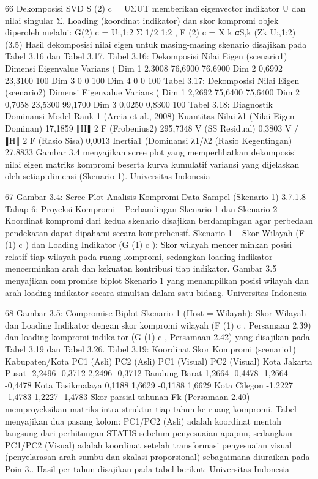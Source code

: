 66
Dekomposisi SVD S
(2)
c = UΣUT memberikan eigenvector indikator U dan nilai singular
Σ. Loading (koordinat indikator) dan skor kompromi objek diperoleh melalui:
G(2)
c = U:,1:2 Σ
1/2
1:2 , F
(2)
c =
X
k
αS,k (Zk U:,1:2) (3.5)
Hasil dekomposisi nilai eigen untuk masing-masing skenario disajikan pada Tabel 3.16
dan Tabel 3.17.
Tabel 3.16: Dekomposisi Nilai Eigen (scenario1)
Dimensi Eigenvalue Varians (%
Dim 1 2,3008 76,6900 76,6900
Dim 2 0,6992 23,3100 100
Dim 3 0 0 100
Dim 4 0 0 100
Tabel 3.17: Dekomposisi Nilai Eigen (scenario2)
Dimensi Eigenvalue Varians (%
Dim 1 2,2692 75,6400 75,6400
Dim 2 0,7058 23,5300 99,1700
Dim 3 0,0250 0,8300 100
Tabel 3.18: Diagnostik Dominansi Model Rank-1 (Areia et al., 2008)
Kuantitas Nilai
λ1 (Nilai Eigen Dominan) 17,1859
∥H∥
2
F
(Frobenius2) 295,7348
V (SS Residual) 0,3803
V /∥H∥
2
F
(Rasio Sisa) 0,0013
Inertia1 (Dominansi %
λ1/λ2 (Rasio Kegentingan) 27,8833
Gambar 3.4 menyajikan scree plot yang memperlihatkan dekomposisi nilai eigen
matriks kompromi beserta kurva kumulatif variansi yang dijelaskan oleh setiap dimensi
(Skenario 1).
Universitas Indonesia

67
Gambar 3.4: Scree Plot Analisis Kompromi Data Sampel (Skenario 1)
3.7.1.8 Tahap 6: Proyeksi Kompromi – Perbandingan Skenario 1 dan Skenario 2
Koordinat kompromi dari kedua skenario disajikan berdampingan agar perbedaan
pendekatan dapat dipahami secara komprehensif.
Skenario 1 – Skor Wilayah (F
(1)
c ) dan Loading Indikator (G
(1)
c ): Skor wilayah mencerminkan posisi relatif tiap wilayah pada ruang kompromi, sedangkan loading indikator
mencerminkan arah dan kekuatan kontribusi tiap indikator. Gambar 3.5 menyajikan compromise biplot Skenario 1 yang menampilkan posisi wilayah dan arah loading indikator
secara simultan dalam satu bidang.
Universitas Indonesia

68
Gambar 3.5: Compromise Biplot Skenario 1 (Host = Wilayah): Skor Wilayah dan Loading
Indikator
dengan skor kompromi wilayah (F
(1)
c , Persamaan 2.39) dan loading kompromi indikator (G
(1)
c , Persamaan 2.42) yang disajikan pada Tabel 3.19 dan Tabel 3.26.
Tabel 3.19: Koordinat Skor Kompromi (scenario1)
Kabupaten/Kota PC1 (Asli) PC2 (Asli) PC1 (Visual) PC2 (Visual)
Kota Jakarta Pusat -2,2496 -0,3712 2,2496 -0,3712
Bandung Barat 1,2664 -0,4478 -1,2664 -0,4478
Kota Tasikmalaya 0,1188 1,6629 -0,1188 1,6629
Kota Cilegon -1,2227 -1,4783 1,2227 -1,4783
Skor parsial tahunan Fk (Persamaan 2.40) memproyeksikan matriks intra-struktur
tiap tahun ke ruang kompromi. Tabel menyajikan dua pasang kolom: PC1/PC2 (Asli)
adalah koordinat mentah langsung dari perhitungan STATIS sebelum penyesuaian apapun,
sedangkan PC1/PC2 (Visual) adalah koordinat setelah transformasi penyesuaian visual
(penyelarasan arah sumbu dan skalasi proporsional) sebagaimana diuraikan pada Poin 3..
Hasil per tahun disajikan pada tabel berikut:
Universitas Indonesia

